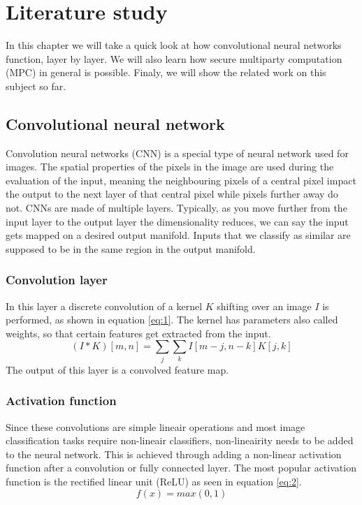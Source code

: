 
\chapter{Literature study}
In this chapter we will take a quick look at how convolutional neural networks function, layer by layer. We will also learn how secure multiparty computation (MPC) in general is possible. Finaly, we will show the related work on this subject so far.

\section{Convolutional neural network}
Convolution neural networks (CNN) is a special type of neural network used for images. The spatial properties of the pixels in the image are used during the evaluation of the input, meaning the neighbouring pixels of a central pixel impact the output to the next layer of that central pixel while pixels further away do not.
CNNs are made of multiple layers. Typically, as you move further from the input layer to the output layer the dimensionality reduces, we can say the input gets mapped on a desired output manifold. Inputs that we classify as similar are supposed to be in the same region in the output manifold.

\subsection{Convolution layer}
In this layer a discrete convolution of a kernel $K$ shifting over an image $I$ is performed, as shown in equation \ref{eq:1}. The kernel has parameters also called weights, so that certain features get extracted from the input.
\begin{equation} \label{eq:1}
  (I*K)[m,n]=\sum_j\sum_k I[m-j,n-k]K[j,k]
\end{equation}
The output of this layer is a convolved feature map.

\subsection{Activation function}
Since these convolutions are simple lineair operations and most image classification tasks require non-lineair classifiers, non-lineairity needs to be added to the neural network. This is achieved through adding a non-linear activation function after a convolution or fully connected layer. The most popular activation function is the rectified linear unit (ReLU) as seen in equation \ref{eq:2}.
\begin{equation} \label{eq:2}
  f(x)=max(0,1)
\end{equation}

